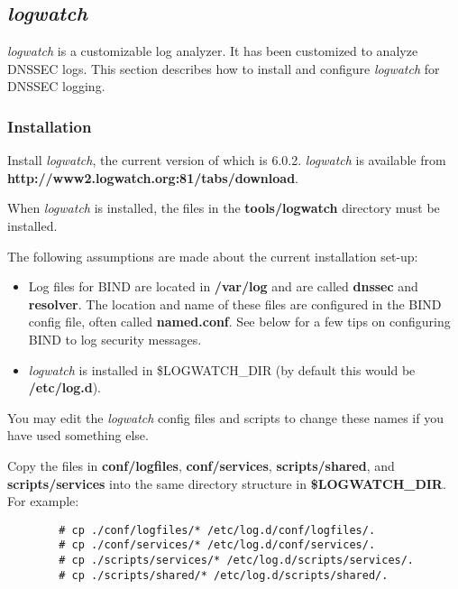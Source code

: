 \documentclass[12pt]{article}
\newcommand{\cmd}[1]{{\em #1}}
\newcommand{\path}[1]{{\bf #1}}
\newcommand{\url}[1]{{\bf #1}}
\begin{document}

\subsection{\cmd{logwatch}}

\cmd{logwatch} is a customizable log analyzer.  It has been customized to
analyze DNSSEC logs.  This section describes how to install and configure
\cmd{logwatch} for DNSSEC logging.


\subsubsection{Installation}

Install \cmd{logwatch}, the current version of which is 6.0.2.
\cmd{logwatch} is available from\\
\url{http://www2.logwatch.org:81/tabs/download}.

When \cmd{logwatch} is installed, the files in the \path{tools/logwatch}
directory must be installed.

The following assumptions are made about the current installation set-up:
\begin{itemize}
\item Log files for BIND are located in \path{/var/log} and are called
\path{dnssec} and \path{resolver}.  The location and name of these files are
configured in the BIND config file, often called \path{named.conf}.  See
below for a few tips on configuring BIND to log security messages.

\item \cmd{logwatch} is installed in \$LOGWATCH\_DIR (by default this would be
\path{/etc/log.d}).
\end{itemize}

You may edit the \cmd{logwatch} config files and scripts to change these names
if you have used something else.

Copy the files in \path{conf/logfiles}, \path{conf/services},
\path{scripts/shared}, and \path{scripts/services} into the same
directory structure in \path{\$LOGWATCH\_DIR}.  For example:

\begin{verbatim}
        # cp ./conf/logfiles/* /etc/log.d/conf/logfiles/.
        # cp ./conf/services/* /etc/log.d/conf/services/.
        # cp ./scripts/services/* /etc/log.d/scripts/services/.
        # cp ./scripts/shared/* /etc/log.d/scripts/shared/.
\end{verbatim}
\end{document}
